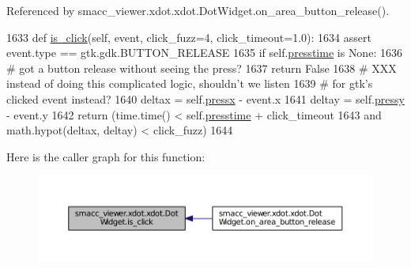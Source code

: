 Referenced by smacc\+\_\+viewer.\+xdot.\+xdot.\+Dot\+Widget.\+on\+\_\+area\+\_\+button\+\_\+release().


\begin{DoxyCode}
1633     \textcolor{keyword}{def }\hyperlink{classsmacc__viewer_1_1xdot_1_1xdot_1_1DotWidget_aeb999fe6900e9e916cf5eacb5d2e0108}{is\_click}(self, event, click\_fuzz=4, click\_timeout=1.0):
1634         \textcolor{keyword}{assert} event.type == gtk.gdk.BUTTON\_RELEASE
1635         \textcolor{keywordflow}{if} self.\hyperlink{classsmacc__viewer_1_1xdot_1_1xdot_1_1DotWidget_a71750fa797569142bc3ab635a7a06b74}{presstime} \textcolor{keywordflow}{is} \textcolor{keywordtype}{None}:
1636             \textcolor{comment}{# got a button release without seeing the press?}
1637             \textcolor{keywordflow}{return} \textcolor{keyword}{False}
1638         \textcolor{comment}{# XXX instead of doing this complicated logic, shouldn't we listen}
1639         \textcolor{comment}{# for gtk's clicked event instead?}
1640         deltax = self.\hyperlink{classsmacc__viewer_1_1xdot_1_1xdot_1_1DotWidget_a6085b280df091fee9dc2aa83ded6b7a9}{pressx} - event.x
1641         deltay = self.\hyperlink{classsmacc__viewer_1_1xdot_1_1xdot_1_1DotWidget_a9dd737f3e46e9e8bc81132068f4dcff5}{pressy} - event.y
1642         \textcolor{keywordflow}{return} (time.time() < self.\hyperlink{classsmacc__viewer_1_1xdot_1_1xdot_1_1DotWidget_a71750fa797569142bc3ab635a7a06b74}{presstime} + click\_timeout
1643                 \textcolor{keywordflow}{and} math.hypot(deltax, deltay) < click\_fuzz)
1644 
\end{DoxyCode}


Here is the caller graph for this function\+:
\nopagebreak
\begin{figure}[H]
\begin{center}
\leavevmode
\includegraphics[width=350pt]{classsmacc__viewer_1_1xdot_1_1xdot_1_1DotWidget_aeb999fe6900e9e916cf5eacb5d2e0108_icgraph}
\end{center}
\end{figure}


